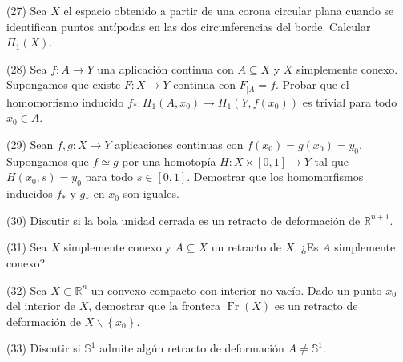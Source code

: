 \documentclass[
  a4paper,
  spanish,
  12pt,
]{scrartcl}
\begin{document}
\begin{ejer}
(27) Sea $X$ el espacio obtenido a partir de una corona circular plana cuando se identifican puntos antípodas en las dos circunferencias del borde. Calcular $\Pi_{1}(X)$.\\
\end{ejer}

\begin{ejer}
(28) Sea $f: A \rightarrow Y$ una aplicación continua con $A \subseteq X$ y $X$ simplemente conexo. Supongamos que existe $F: X \rightarrow Y$ continua con $F_{\mid A}=f$. Probar que el homomorfismo inducido $f_{*}: \Pi_{1}\left(A, x_{0}\right) \rightarrow \Pi_{1}\left(Y, f\left(x_{0}\right)\right)$ es trivial para todo $x_{0} \in A$.\\
\end{ejer}

\begin{ejer}
(29) Sean $f, g: X \rightarrow Y$ aplicaciones continuas con $f\left(x_{0}\right)=g\left(x_{0}\right)=y_{0}$. Supongamos que $f \simeq g$ por una homotopía $H: X \times[0,1] \rightarrow Y$ tal que $H\left(x_{0}, s\right)=y_{0}$ para todo $s \in[0,1]$. Demostrar que los homomorfismos inducidos $f_{*}$ y $g_{*}$ en $x_{0}$ son iguales.\\
\end{ejer}

\begin{ejer}
(30) Discutir si la bola unidad cerrada es un retracto de deformación de $\mathbb{R}^{n+1}$.\\
\end{ejer}

\begin{ejer}
(31) Sea $X$ simplemente conexo y $A \subseteq X$ un retracto de $X$. ¿Es $A$ simplemente conexo?\\
\end{ejer}

\begin{ejer}
(32) Sea $X \subset \mathbb{R}^{n}$ un convexo compacto con interior no vacío. Dado un punto $x_{0}$ del interior de $X$, demostrar que la frontera $\operatorname{Fr}(X)$ es un retracto de deformación de $X \backslash\left\{x_{0}\right\}$.\\
\end{ejer}

\begin{ejer}
(33) Discutir si $\mathbb{S}^{1}$ admite algún retracto de deformación $A \neq \mathbb{S}^{1}$.\\
\end{ejer}
\end{document}
